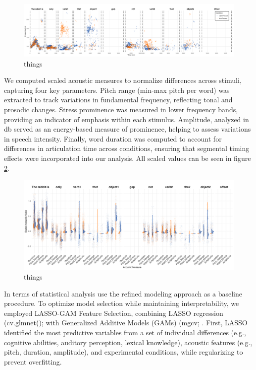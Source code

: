 \begin{figure}[H]  %
    \centering
    \includegraphics[width=\textwidth,height=\textheight,keepaspectratio]{viz/accoustic.png}
    \caption{things}
    \label{fig:acoustic}
\end{figure}

We computed scaled acoustic measures to normalize differences across stimuli, capturing four key parameters. Pitch range (min-max pitch per word) was extracted to track variations in fundamental frequency, reflecting tonal and prosodic changes. Stress prominence was measured in lower frequency bands, providing an indicator of emphasis within each stimulus. Amplitude, analyzed in db served as an energy-based measure of prominence, helping to assess variations in speech intensity. Finally, word duration was computed to account for differences in articulation time across conditions, ensuring that segmental timing effects were incorporated into our analysis. All scaled values can be seen in figure \ref{fig:acoustic_faceted}.

\begin{figure}[H]  %
    \centering
    \includegraphics[width=\textwidth,height=\textheight,keepaspectratio]{viz/acoustic_faceted.png}
    \caption{things}
    \label{fig:acoustic_faceted}
\end{figure}


In terms of statistical analysis use the refined modeling approach as a baseline procedure. To optimize model selection while maintaining interpretability, we employed LASSO-GAM Feature Selection, combining LASSO regression (cv.glmnet(); \citep{Friedman2010} with Generalized Additive Models (GAMs) (mgcv; \citep{Wood2017}. First, LASSO identified the most predictive variables from a set of individual differences (e.g., cognitive abilities, auditory perception, lexical knowledge), acoustic features (e.g., pitch, duration, amplitude), and experimental conditions, while regularizing to prevent overfitting.

